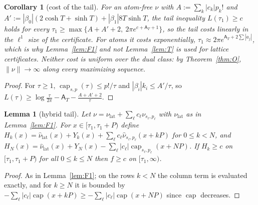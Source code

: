 \documentclass[10pt]{amsart}
\newtheorem{lemma}[theorem]{Lemma}
\newtheorem{corollary}[theorem]{Corollary}
\theoremstyle{definition}
\theoremstyle{remark}
\newcommand{\nuh}{\widehat\nu}
\newcommand{\Aconst}{\mathsf A_T}
\begin{document}
\begin{corollary}[cost of the tail]\label{cor:T2}
For an atom-free $\nu$ with $A:=\sum_k|c_k|p_k!$ and $A':=|\beta_0|(2\cosh T+\sinh T)+|\beta_1|8T\sinh T$,
the tail inequality $L(\tau_1)\ge c$ holds for every $\tau_1\ge\max\{A+A'+2,\ 2\pi e^{c+\Aconst+1}\}$,
so the tail costs linearly in the $\ell^1$ size of the certificate. For atoms it costs
exponentially, $\tau_1\approx2\pi e^{\Aconst+2\sum|a_j|}$, which is why Lemma~\ref{lem:F1} and not
Lemma~\ref{lem:T} is used for lattice certificates. Neither cost is uniform over the dual class:
by Theorem~\ref{thm:O}, $\|\nu\|\to\infty$ along every maximizing sequence.
\end{corollary}
\begin{proof}
For $\tau\ge1$, $\operatorname{cap}_{s,p}(\tau)\le p!/\tau$ and $|\beta_i|k_i\le A'/\tau$, so
$L(\tau)\ge\log\frac\tau{2\pi}-\Aconst-\frac{A+A'+2}{\tau}$.
\end{proof}

\begin{lemma}[hybrid tail]\label{lem:hybrid}
Let $\nu=\nu_{\mathrm{lat}}+\sum_\ell c_\ell\nu_{s_\ell,p_\ell}$ with $\nu_{\mathrm{lat}}$ as in Lemma~\ref{lem:F1}.
For $x\in[\tau_1,\tau_1+P)$ define $H_k(x)=\nuh_{\mathrm{lat}}(x)+Y_k(x)+\sum_\ell c_\ell\nuh_{s_\ell,p_\ell}(x+kP)$
for $0\le k<N$, and $H_N(x)=\nuh_{\mathrm{lat}}(x)+Y_N(x)-\sum_\ell|c_\ell|\operatorname{cap}_{s_\ell,p_\ell}(x+NP)$.
If $H_k\ge c$ on $[\tau_1,\tau_1+P)$ for all $0\le k\le N$ then $f\ge c$ on $[\tau_1,\infty)$.
\end{lemma}
\begin{proof}
As in Lemma~\ref{lem:F1}; on the rows $k<N$ the column term is evaluated exactly, and for
$k\ge N$ it is bounded by $-\sum_\ell|c_\ell|\operatorname{cap}(x+kP)\ge-\sum_\ell|c_\ell|\operatorname{cap}(x+NP)$
since $\operatorname{cap}$ decreases.
\end{proof}
\end{document}
